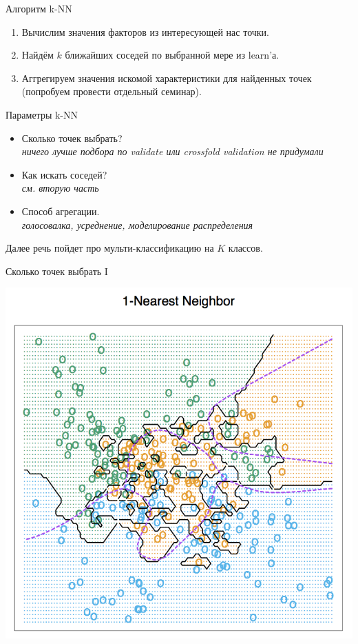 \documentclass[14pt, fleqn, xcolor={dvipsnames, table}]{beamer}
\begin{document}
\begin{frame}{Алгоритм k-NN}
  \begin{enumerate}
    \item Вычислим значения факторов из интересующей нас точки.
    \item Найдём $k$ ближайших соседей по выбранной мере из learn'а.
    \item Аггрегируем значения искомой характеристики для найденных точек (попробуем провести отдельный семинар).
  \end{enumerate}
\end{frame}

\begin{frame}{Параметры k-NN}
  \begin{itemize}
    \item Сколько точек выбрать? \\
    \emph{ничего лучше подбора по validate или crossfold validation не придумали}
    \item Как искать соседей? \\
    \emph{см. вторую часть}
    \item Способ агрегации. \\
    \emph{голосовалка, усреднение, моделирование распределения}
  \end{itemize}
  Далее речь пойдет про мульти-классификацию на $K$ классов.
\end{frame}

\begin{frame}{Сколько точек выбрать I}
\begin{center}
\includegraphics[height=0.8\textheight]{13_3_2.png}
\end{center}
\end{frame}
\end{document}
